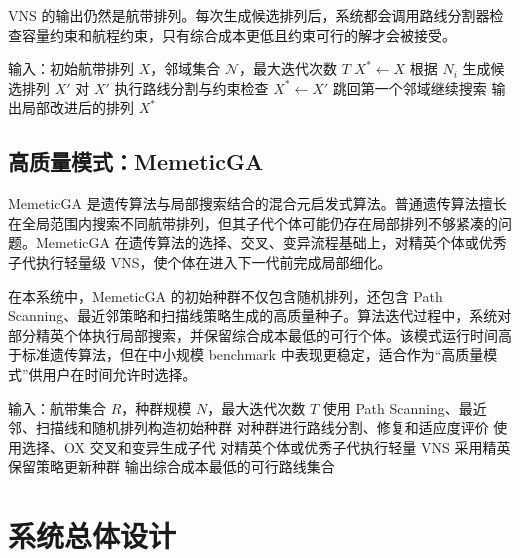 \documentclass[UTF8,a4paper,12pt]{ctexart}
\begin{document}
VNS 的输出仍然是航带排列。每次生成候选排列后，系统都会调用路线分割器检查容量约束和航程约束，只有综合成本更低且约束可行的解才会被接受。

\begin{algorithm}[H]
\caption{VNS 局部改进算法}
\begin{algorithmic}[1]
\State 输入：初始航带排列 \(X\)，邻域集合 \(\mathcal{N}\)，最大迭代次数 \(T\)
\State \(X^\ast \gets X\)
        \State 根据 \(N_i\) 生成候选排列 \(X'\)
        \State 对 \(X'\) 执行路线分割与约束检查
            \State \(X^\ast \gets X'\)
            \State 跳回第一个邻域继续搜索
        \EndIf
    \EndFor
\EndFor
\State 输出局部改进后的排列 \(X^\ast\)
\end{algorithmic}
\end{algorithm}

\subsection{高质量模式：MemeticGA}

MemeticGA 是遗传算法与局部搜索结合的混合元启发式算法。普通遗传算法擅长在全局范围内搜索不同航带排列，但其子代个体可能仍存在局部排列不够紧凑的问题。MemeticGA 在遗传算法的选择、交叉、变异流程基础上，对精英个体或优秀子代执行轻量级 VNS，使个体在进入下一代前完成局部细化。

在本系统中，MemeticGA 的初始种群不仅包含随机排列，还包含 Path Scanning、最近邻策略和扫描线策略生成的高质量种子。算法迭代过程中，系统对部分精英个体执行局部搜索，并保留综合成本最低的可行个体。该模式运行时间高于标准遗传算法，但在中小规模 benchmark 中表现更稳定，适合作为“高质量模式”供用户在时间允许时选择。

\begin{algorithm}[H]
\caption{MemeticGA 高质量求解算法}
\begin{algorithmic}[1]
\State 输入：航带集合 \(R\)，种群规模 \(N\)，最大迭代次数 \(T\)
\State 使用 Path Scanning、最近邻、扫描线和随机排列构造初始种群
    \State 对种群进行路线分割、修复和适应度评价
    \State 使用选择、OX 交叉和变异生成子代
    \State 对精英个体或优秀子代执行轻量 VNS
    \State 采用精英保留策略更新种群
\EndFor
\State 输出综合成本最低的可行路线集合
\end{algorithmic}
\end{algorithm}

\section{系统总体设计}
\end{document}
